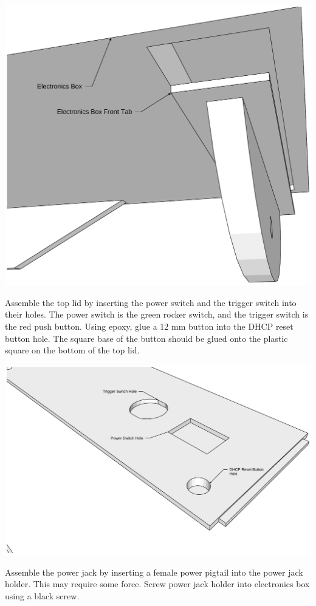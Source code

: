 \documentclass[letterpaper,10pt,english]{sphinxmanual}
\begin{document}
\includegraphics{ElectronicsBoxFrontTabInstallation.pdf}

Assemble the top lid by inserting the power switch and the trigger switch into their holes. The power switch is the green rocker switch, and the trigger switch is the red push button. Using epoxy, glue a 12 mm button into the DHCP reset button hole. The square base of the button should be glued onto the plastic square on the bottom of the top lid.

\includegraphics{TopLidButtonInstallation.pdf}

Assemble the power jack by inserting a female power pigtail into the power jack holder. This may require some force. Screw power jack holder into electronics box using a black screw.
\end{document}
